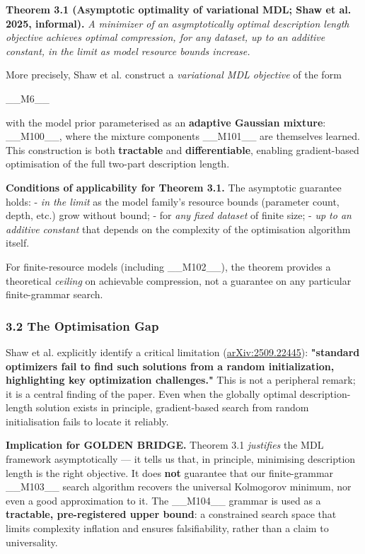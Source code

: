 \textbf{Theorem 3.1 (Asymptotic optimality of variational MDL; Shaw et al. 2025, informal).} \textit{A minimizer of an asymptotically optimal description length objective achieves optimal compression, for any dataset, up to an additive constant, in the limit as model resource bounds increase.}

More precisely, Shaw et al. construct a \textit{variational MDL objective} of the form

\_\_M6\_\_

with the model prior parameterised as an \textbf{adaptive Gaussian mixture}: \_\_M100\_\_, where the mixture components \_\_M101\_\_ are themselves learned. This construction is both \textbf{tractable} and \textbf{differentiable}, enabling gradient-based optimisation of the full two-part description length.

\textbf{Conditions of applicability for Theorem 3.1.} The asymptotic guarantee holds:
- \textit{in the limit} as the model family's resource bounds (parameter count, depth, etc.) grow without bound;
- for \textit{any fixed dataset} of finite size;
- \textit{up to an additive constant} that depends on the complexity of the optimisation algorithm itself.

For finite-resource models (including \_\_M102\_\_), the theorem provides a theoretical \textit{ceiling} on achievable compression, not a guarantee on any particular finite-grammar search.

\subsubsection{3.2 The Optimisation Gap}

Shaw et al. explicitly identify a critical limitation (\href{https://arxiv.org/abs/2509.22445}{arXiv:2509.22445}): \textbf{"standard optimizers fail to find such solutions from a random initialization, highlighting key optimization challenges."} This is not a peripheral remark; it is a central finding of the paper. Even when the globally optimal description-length solution exists in principle, gradient-based search from random initialisation fails to locate it reliably.

\textbf{Implication for GOLDEN BRIDGE.} Theorem 3.1 \textit{justifies} the MDL framework asymptotically --- it tells us that, in principle, minimising description length is the right objective. It does \textbf{not} guarantee that our finite-grammar \_\_M103\_\_ search algorithm recovers the universal Kolmogorov minimum, nor even a good approximation to it. The \_\_M104\_\_ grammar is used as a \textbf{tractable, pre-registered upper bound}: a constrained search space that limits complexity inflation and ensures falsifiability, rather than a claim to universality.

